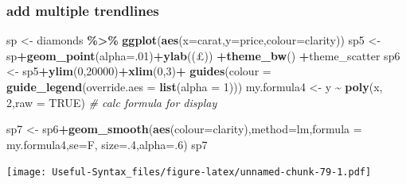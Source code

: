 \documentclass[
]{article}
\newenvironment{Shaded}{\begin{snugshade}}{\end{snugshade}}
\newcommand{\AttributeTok}[1]{\textcolor[rgb]{0.13,0.29,0.53}{#1}}
\newcommand{\CommentTok}[1]{\textcolor[rgb]{0.56,0.35,0.01}{\textit{#1}}}
\newcommand{\ConstantTok}[1]{\textcolor[rgb]{0.56,0.35,0.01}{#1}}
\newcommand{\DecValTok}[1]{\textcolor[rgb]{0.00,0.00,0.81}{#1}}
\newcommand{\FunctionTok}[1]{\textcolor[rgb]{0.13,0.29,0.53}{\textbf{#1}}}
\newcommand{\NormalTok}[1]{#1}
\newcommand{\OtherTok}[1]{\textcolor[rgb]{0.56,0.35,0.01}{#1}}
\newcommand{\SpecialCharTok}[1]{\textcolor[rgb]{0.81,0.36,0.00}{\textbf{#1}}}
\newcommand{\StringTok}[1]{\textcolor[rgb]{0.31,0.60,0.02}{#1}}
\begin{document}
\hypertarget{add-multiple-trendlines}{%
\subsubsection{add multiple trendlines}\label{add-multiple-trendlines}}

\begin{Shaded}
\begin{Highlighting}[]
\NormalTok{sp }\OtherTok{\textless{}{-}}\NormalTok{ diamonds }\SpecialCharTok{\%\textgreater{}\%} \FunctionTok{ggplot}\NormalTok{(}\FunctionTok{aes}\NormalTok{(}\AttributeTok{x=}\NormalTok{carat,}\AttributeTok{y=}\NormalTok{price,}\AttributeTok{colour=}\NormalTok{clarity))}
\NormalTok{sp5 }\OtherTok{\textless{}{-}}\NormalTok{ sp}\SpecialCharTok{+}\FunctionTok{geom\_point}\NormalTok{(}\AttributeTok{alpha=}\NormalTok{.}\DecValTok{01}\NormalTok{)}\SpecialCharTok{+}\FunctionTok{ylab}\NormalTok{(}\StringTok{\textquotesingle{}(£)\textquotesingle{}}\NormalTok{) }\SpecialCharTok{+}\FunctionTok{theme\_bw}\NormalTok{() }\SpecialCharTok{+}\NormalTok{theme\_scatter}
\NormalTok{sp6 }\OtherTok{\textless{}{-}}\NormalTok{ sp5}\SpecialCharTok{+}\FunctionTok{ylim}\NormalTok{(}\DecValTok{0}\NormalTok{,}\DecValTok{20000}\NormalTok{)}\SpecialCharTok{+}\FunctionTok{xlim}\NormalTok{(}\DecValTok{0}\NormalTok{,}\DecValTok{3}\NormalTok{)}\SpecialCharTok{+} \FunctionTok{guides}\NormalTok{(}\AttributeTok{colour =} \FunctionTok{guide\_legend}\NormalTok{(}\AttributeTok{override.aes =} \FunctionTok{list}\NormalTok{(}\AttributeTok{alpha =} \DecValTok{1}\NormalTok{)))}
\NormalTok{my.formula4 }\OtherTok{\textless{}{-}}\NormalTok{ y }\SpecialCharTok{\textasciitilde{}} \FunctionTok{poly}\NormalTok{(x, }\DecValTok{2}\NormalTok{,}\AttributeTok{raw =} \ConstantTok{TRUE}\NormalTok{) }\CommentTok{\# calc formula for display}

\NormalTok{sp7 }\OtherTok{\textless{}{-}}\NormalTok{ sp6}\SpecialCharTok{+}\FunctionTok{geom\_smooth}\NormalTok{(}\FunctionTok{aes}\NormalTok{(}\AttributeTok{colour=}\NormalTok{clarity),}\AttributeTok{method=}\StringTok{\textquotesingle{}lm\textquotesingle{}}\NormalTok{,}\AttributeTok{formula =}\NormalTok{ my.formula4,}\AttributeTok{se=}\NormalTok{F, }\AttributeTok{size=}\NormalTok{.}\DecValTok{4}\NormalTok{,}\AttributeTok{alpha=}\NormalTok{.}\DecValTok{6}\NormalTok{)}
\NormalTok{sp7}
\end{Highlighting}
\end{Shaded}

\texttt{[image: Useful-Syntax\_files/figure-latex/unnamed-chunk-79-1.pdf]}
\end{document}

